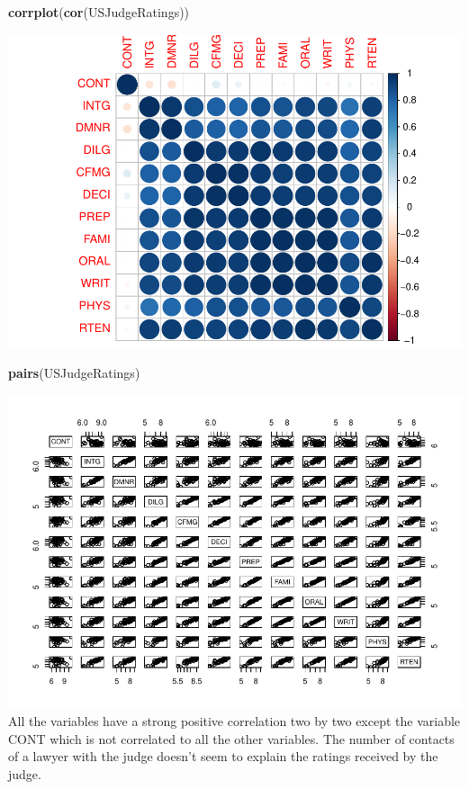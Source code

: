 \documentclass[]{article}
\newenvironment{Shaded}{\begin{snugshade}}{\end{snugshade}}
\newcommand{\KeywordTok}[1]{\textcolor[rgb]{0.13,0.29,0.53}{\textbf{#1}}}
\newcommand{\NormalTok}[1]{#1}
\begin{document}
\begin{Shaded}
\begin{Highlighting}[]
\KeywordTok{corrplot}\NormalTok{(}\KeywordTok{cor}\NormalTok{(USJudgeRatings))}
\end{Highlighting}
\end{Shaded}

\includegraphics{Homework_Adrien_Toulouse_Paul-Antoine_Girard_files/figure-latex/linear relationships between variables 2-1.pdf}

\begin{Shaded}
\begin{Highlighting}[]
\KeywordTok{pairs}\NormalTok{(USJudgeRatings)}
\end{Highlighting}
\end{Shaded}

\includegraphics{Homework_Adrien_Toulouse_Paul-Antoine_Girard_files/figure-latex/pairs-1.pdf}
All the variables have a strong positive correlation two by two except
the variable CONT which is not correlated to all the other variables.
The number of contacts of a lawyer with the judge doesn't seem to
explain the ratings received by the judge.
\end{document}
